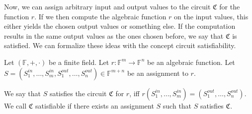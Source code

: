 Now, we can assign arbitrary input and output values to the circuit $\mathfrak{C}$ for the function $r$.
If we then compute the algebraic function $r$ on the input values, this either yields the chosen output values or something else.
If the computation results in the same output values as the ones chosen before, we say that $\mathfrak{C}$ is satisfied.
We can formalize these ideas with the concept circuit satisfiability.
% 
\begin{definition}
    \label{circuitSat}
    Let $(\mathbb{F}, +, \cdot )$ be a finite field.
    Let $r:\mathbb{F}^m\to \mathbb{F}^n$ be an algebraic function.
    Let $S=(S_1^{in}, \dots, S_{m}^{in}, S_1^{out},\dots, S_{n}^{out})\in\mathbb{F}^{m+n}$ be an assignment to $r$.

    We say that $S$ satisfies the circuit $\mathfrak{C}$ for $r$, iff $r(S_1^{in},\dots, S_{m}^{in})=(S_1^{out},\dots, S_{n}^{out})$.
    We call $\mathfrak{C}$ satisfiable if there exists an assignment $S$ such that $S$ satisfies $\mathfrak{C}$.
    
\end{definition}
% 
